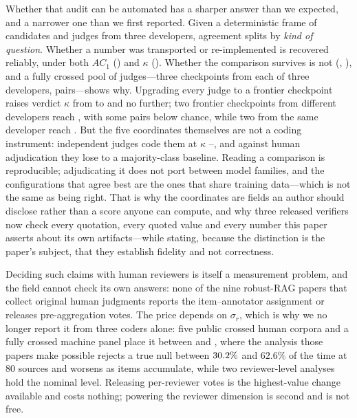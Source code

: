 \documentclass[11pt]{article}
\begin{document}
Whether that audit can be automated has a sharper answer than we expected, and
a narrower one than we first reported. Given a deterministic frame of
\FrameCandidates{} candidates and judges from three developers, agreement
splits by \emph{kind of question}. Whether a number was transported or
re-implemented is recovered reliably, under both $AC_1$ (\DecProv{}) and
$\kappa$ (\DecProvK{}). Whether the comparison survives is not (\DecVerdict{},
\DecVerdictK{}), and a fully crossed pool of \TierPanelN{} judges---three
checkpoints from each of three developers, \TierNPairs{} pairs---shows why.
Upgrading every judge to a frontier checkpoint raises verdict $\kappa$ from
\TierSubmittedVerdictK{} to \TierFrontierVerdictK{} and no further; two frontier
checkpoints from different developers reach \TierCompFFCross{}, with some pairs
below chance, while two from the same developer reach \TierCompFFSame{}. But
the five coordinates themselves are not a coding instrument:
independent judges code them at $\kappa$ \DecCoordKMin{}--\DecCoordKMax{}, and
against human adjudication they lose to a majority-class baseline. Reading a
comparison is reproducible; adjudicating it does not port between model
families, and the configurations that agree best are the ones that share
training data---which is not the same as being right. That is why the
coordinates are fields an author should disclose rather than a score anyone can
compute, and why three released verifiers now check every quotation, every
quoted value and every number this paper asserts about its own artifacts---while
stating, because the distinction is the paper's subject, that they establish
fidelity and not correctness.

Deciding such claims with human reviewers is itself a measurement problem, and
the field cannot check its own answers: none of the nine robust-RAG papers that
collect original human judgments reports the item--annotator assignment or
releases pre-aggregation votes. The price depends on $\sigma_r$, which is why
we no longer report it from three coders alone: five public crossed human
corpora and a fully crossed machine panel place it between \SigmaMin{} and
\SigmaMax{}, where the analysis those papers make possible rejects a true null
between $30.2\%$ and $62.6\%$ of the time at 80 sources and worsens as
items accumulate, while two reviewer-level analyses hold the nominal level.
Releasing per-reviewer votes is the highest-value change available and costs
nothing; powering the reviewer dimension is second and is not free.
\end{document}
